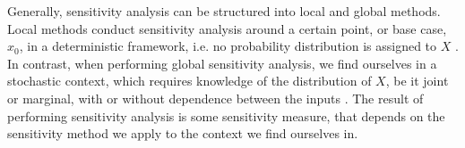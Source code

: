 Generally, sensitivity analysis can be structured into local and global methods. Local methods conduct sensitivity analysis around a certain point, or base case, $x_0$, in a deterministic framework, i.e. no probability distribution is assigned to $X$ \citep{BP16}. In contrast, when performing global sensitivity analysis, we find ourselves in a stochastic context, which requires knowledge of the distribution of $X$, be it joint or marginal, with or without dependence between the inputs \citep{ST02}. The result of performing sensitivity analysis is some sensitivity measure, that depends on the sensitivity method we apply to the context we find ourselves in.









